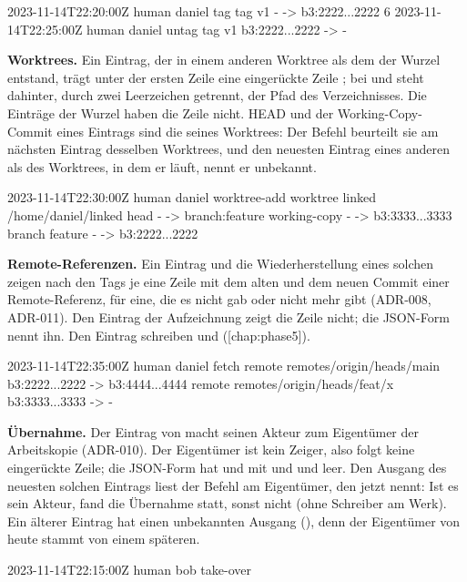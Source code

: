   2023-11-14T22:20:00Z  human daniel  tag
    tag v1  - -> b3:2222...2222
6  2023-11-14T22:25:00Z  human daniel  untag
    tag v1  b3:2222...2222 -> -
\stoptyping

{\bf Worktrees.} Ein Eintrag, der in einem anderen Worktree als dem der Wurzel entstand, trägt
unter der ersten Zeile eine eingerückte Zeile ; bei  und
 steht dahinter, durch zwei Leerzeichen getrennt, der Pfad des Verzeichnisses.
Die Einträge der Wurzel haben die Zeile nicht. HEAD und der Working-Copy-Commit eines Eintrags
sind die seines Worktrees: Der Befehl beurteilt sie am nächsten Eintrag desselben Worktrees, und
den neuesten Eintrag eines anderen als des Worktrees, in dem er läuft, nennt er unbekannt.

  2023-11-14T22:30:00Z  human daniel  worktree-add
    worktree linked  /home/daniel/linked
    head  - -> branch:feature
    working-copy  - -> b3:3333...3333
    branch feature  - -> b3:2222...2222
\stoptyping

{\bf Remote-Referenzen.} Ein Eintrag  und die Wiederherstellung eines solchen
zeigen nach den Tags je eine Zeile  mit dem alten und dem neuen Commit einer
Remote-Referenz, \type{-} für eine, die es nicht gab oder nicht mehr gibt (ADR-008, ADR-011).
Den Eintrag der Aufzeichnung zeigt die Zeile nicht; die JSON-Form nennt ihn.
Den Eintrag schreiben  und  ([chap:phase5]).

  2023-11-14T22:35:00Z  human daniel  fetch
    remote remotes/origin/heads/main  b3:2222...2222 -> b3:4444...4444
    remote remotes/origin/heads/feat/x  b3:3333...3333 -> -
\stoptyping

{\bf Übernahme.} Der Eintrag von  macht seinen Akteur zum Eigentümer der
Arbeitskopie (ADR-010). Der Eigentümer ist kein Zeiger, also folgt keine eingerückte Zeile;
die JSON-Form hat  und  mit  und 
und  leer. Den Ausgang des neuesten solchen Eintrags liest der Befehl am Eigentümer, den
 jetzt nennt: Ist es sein Akteur, fand die Übernahme statt,
sonst nicht (ohne Schreiber am Werk). Ein älterer Eintrag  hat einen
unbekannten Ausgang (), denn der Eigentümer von heute stammt von einem späteren.

  2023-11-14T22:15:00Z  human bob  take-over
\stoptyping

